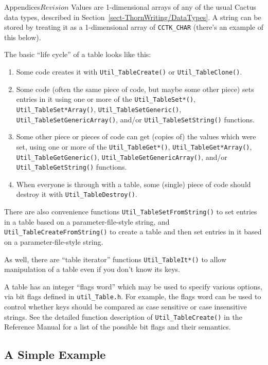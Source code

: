 \begin{cactuspart}{Appendices}{}{$Revision$}
Values are 1-dimensional arrays of any of the usual Cactus data types,
described in Section~\ref{sect-ThornWriting/DataTypes}.
A string can be stored by treating it as a 1-dimensional array of
\verb|CCTK_CHAR| (there's an example of this below).

The basic ``life cycle'' of a table looks like this:
\begin{enumerate}
\item	Some code creates it with \verb|Util_TableCreate()|
	or \verb|Util_TableClone()|.
\item	Some code (often the same piece of code, but maybe some
	other piece) sets entries in it using one or more of
	the \verb|Util_TableSet*()|, \verb|Util_TableSet*Array()|,
	\verb|Util_TableSetGeneric()|, \verb|Util_TableSetGenericArray()|,
	and/or \verb|Util_TableSetString()| functions.
\item	Some other piece or pieces of code can get (copies of)
	the values which were set, using one or more of the
	\verb|Util_TableGet*()|, \verb|Util_TableGet*Array()|,
	\verb|Util_TableGetGeneric()|, \verb|Util_TableGetGenericArray()|,
	and/or \verb|Util_TableGetString()| functions.
\item	When everyone is through with a table, some (single)
	piece of code should destroy it with \verb|Util_TableDestroy()|.
\end{enumerate}

There are also convenience functions \verb|Util_TableSetFromString()|
to set entries in a table based on a parameter-file-style string,
and \verb|Util_TableCreateFromString()| to create a table and then
set entries in it based on a parameter-file-style string.

As well, there are ``table iterator'' functions \verb|Util_TableIt*()|
to allow manipulation of a table even if you don't know its keys.

A table has an integer ``flags word'' which may be used to specify
various options, via bit flags defined in \verb|util_Table.h|.
For example, the flags word can be used to control whether keys
should be compared as case sensitive or case insensitive strings.
See the detailed function description of \verb|Util_TableCreate()|
in the Reference Manual for a list
of the possible bit flags and their semantics.


\subsection{A Simple Example}
\label{Tables_Simple_Example}


\end{cactuspart}
